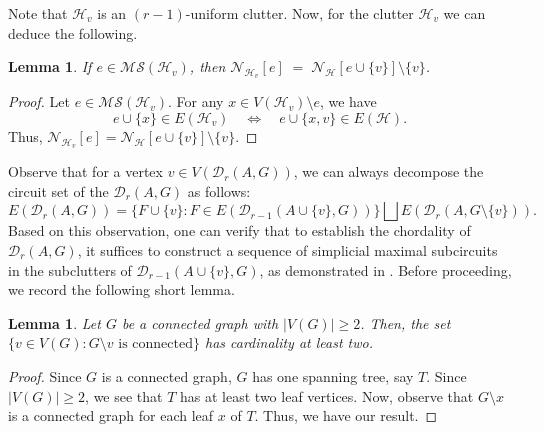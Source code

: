 \documentclass[12pt,reqno]{amsart}
\newtheorem{lemma}[proposition]{Lemma}
\theoremstyle{definition}
\def\H{\mathcal{H}}
\def\N{\mathcal{N}}
\def\D{\mathcal{D}}
\def\MS{\mathcal{MS}}
\begin{document}
Note that $\H_v$ is an $(r-1)$-uniform clutter. Now, for the clutter $\H_v$ we can deduce the following.
\begin{lemma}\label{nbhd equality}
    If $e \in \MS(\H_v)$, then $\N_{\H_v}[e] \;=\; \N_{\H}[e \cup \{v\}] \setminus \{v\}$.
\end{lemma}
\begin{proof}
    Let $e \in \MS(\H_v)$.  
    For any $x \in V(\H_v) \setminus e$, we have
    \[
        e \cup \{x\} \in E(\H_v) 
        \quad\Longleftrightarrow\quad 
        e \cup \{x,v\} \in E(\H).
    \]  
    Thus, $\N_{\H_v}[e] = \N_{\H}[e \cup \{v\}] \setminus \{v\}$.
\end{proof}

Observe that for a vertex $v \in V(\D_r(A,G))$, we can always decompose the circuit set of the $\D_r(A,G)$ as follows:
\begin{equation}\label{eq:2}
    E(\D_r(A,G)) = \{F \cup \{v\} : F \in E(\D_{r-1}(A \cup \{v\},G))\} \bigsqcup E(\D_r(A, G\setminus \{v\})).
\end{equation}
Based on this observation, one can verify that to establish the chordality of $\D_r(A,G)$, it suffices to construct a sequence of simplicial maximal subcircuits in the subclutters of $\D_{r-1}(A \cup \{v\}, G)$, as demonstrated in . Before proceeding, we record the following short lemma.
	\begin{lemma}\label{connectivity lemma}
		Let $G$ be a connected graph with $|V(G)| \geq 2$. Then, the set $\{v \in V(G): G \setminus v \text{ is connected}\}$ has cardinality at least two.
	\end{lemma}
	\begin{proof} 
		Since $G$ is a connected graph, $G$ has one spanning tree, say $T$. Since $|V(G)|\ge 2$, we see that $T$ has at least two leaf vertices. Now, observe that $G\setminus x$ is a connected graph for each leaf $x$ of $T$. Thus, we have our result.
	\end{proof}
\end{document}
